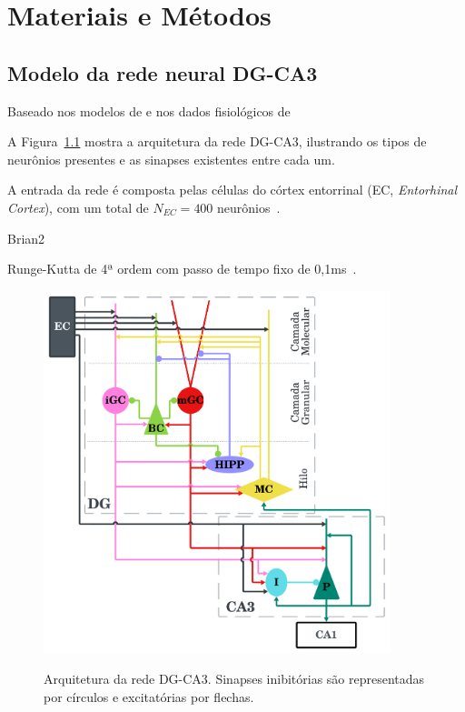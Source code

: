 \chapter{Materiais e Métodos}

\section{Modelo da rede neural DG-CA3}



Baseado nos modelos de \cite{kimAdult2024,yangDynamic2025,chavlisDendrites2017} e nos dados fisiológicos
de~\cite{wheelerHippocampomeorg2023}

A Figura~\ref{fig:arquitetura-rede} mostra a arquitetura da rede DG-CA3, ilustrando os tipos de neurônios presentes e as sinapses
existentes entre cada um.

A entrada da rede é composta pelas células do córtex entorrinal (EC, \textit{Entorhinal Cortex}),
com um total de $N_{EC} = 400$ neurônios~\cite{amaralChapter1990,kimAdult2024}.

\cite{myersRole2009, myersPattern2011}

Brian2~\cite{stimbergBrian2019a}

Runge-Kutta de 4ª ordem com passo de tempo fixo de 0,1ms~\cite{butcherHistory1996}.

\begin{figure}
    \centering
    \caption{Arquitetura da rede DG-CA3. Sinapses inibitórias são representadas por círculos e excitatórias por flechas.}
    \includegraphics[width=0.9\textwidth]{figuras/arquitetura-rede.png}
    \label{fig:arquitetura-rede}
\end{figure}


